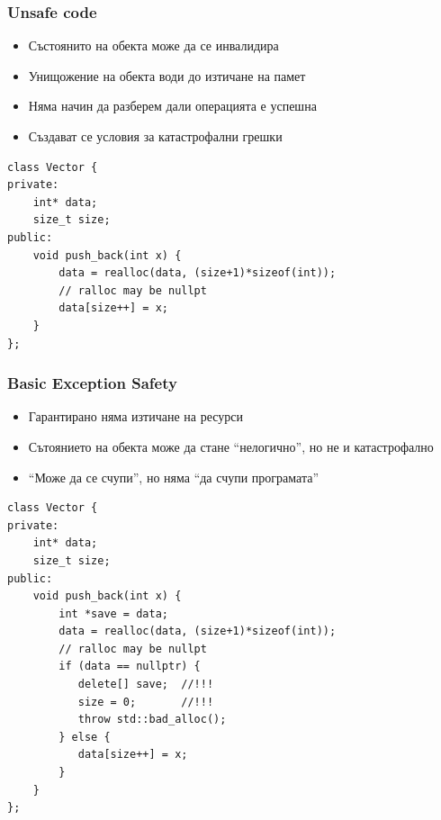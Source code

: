 \documentclass{beamer}
\begin{document}
\begin{frame}[fragile]
\frametitle{Unsafe code}

\begin{itemize}
  \item Състоянито на обекта може да се инвалидира 
  \item Унищожение на обекта води до изтичане на памет
  \item Няма начин да разберем дали операцията е успешна
  \item Създават се условия за катастрофални грешки
\end{itemize}

\begin{flushleft}
\begin{lstlisting}
class Vector {
private:
    int* data;
    size_t size;
public:
    void push_back(int x) {
        data = realloc(data, (size+1)*sizeof(int));
        // ralloc may be nullpt
        data[size++] = x;
    }
};
\end{lstlisting}
\end{flushleft}

\end{frame}


\begin{frame}[fragile]
\frametitle{Basic Exception Safety}

\begin{itemize}
  \item Гарантирано няма изтичане на ресурси
  \item Сътоянието на обекта може да стане ``нелогично'', но не и катастрофално
  \item ``Може да се счупи'', но няма ``да счупи програмата''
\end{itemize}

\begin{flushleft}
\begin{lstlisting}
class Vector {
private:
    int* data;
    size_t size;
public:
    void push_back(int x) {
        int *save = data;
        data = realloc(data, (size+1)*sizeof(int));
        // ralloc may be nullpt
        if (data == nullptr) {
           delete[] save;  //!!!
           size = 0;       //!!!
           throw std::bad_alloc();
        } else {
           data[size++] = x;
        }
    }
};
\end{lstlisting}
\end{flushleft}

\end{frame}
\end{document}
